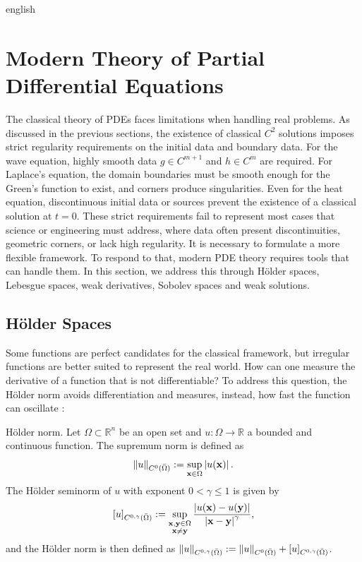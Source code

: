 \documentclass[0000.tex]{subfiles}
\begin{document}
\begin{hyphenrules}{english}
\section{Modern Theory of Partial Differential Equations}\label{sec:modern-theory}

The classical theory of PDEs faces limitations when handling real problems. As discussed in the
previous sections, the existence of classical $C^2$ solutions imposes strict regularity requirements on
the initial data and boundary data. For the wave equation, highly smooth data $g\in C^{m+1}$ and
$h\in C^m$ are required. For Laplace's equation, the domain boundaries must be smooth enough for the
Green's function to exist, and corners produce singularities. Even for the heat equation, discontinuous
initial data or sources prevent the existence of a classical solution at $t=0$. These strict
requirements fail to represent most cases that science or engineering must address, where data often
present discontinuities, geometric corners, or lack high regularity. It is necessary to formulate a more
flexible framework. To respond to that, modern PDE theory requires tools that can handle them. In this
section, we address this through Hölder spaces, Lebesgue spaces, weak derivatives, Sobolev spaces and
weak solutions.

\subsection{Hölder Spaces}\label{subsec:holder}

Some functions are perfect candidates for the classical framework, but irregular functions are better
suited to represent the real world. How can one measure the derivative of a function that is not
differentiable? To address this question, the Hölder norm avoids differentiation and measures, instead,
how fast the function can oscillate \cite{evans2010}:

\begin{definicion}{Hölder norm.}\label{def:holder-norm}
Let $\Omega\subset\mathbb{R}^n$ be an open set and $u:\Omega\to\mathbb{R}$ a bounded and continuous function. The
supremum norm is defined as
\[
  \left\lVert u \right\rVert_{C^0(\bar\Omega)}:=\sup_{\mathbf{x}\in\Omega}\left\lvert u(\mathbf{x}) \right\rvert.
\]
The Hölder seminorm of $u$ with exponent $0<\gamma\le1$ is given by
\[
  [u]_{C^{0,\gamma}(\bar\Omega)}:=\sup_{\substack{\mathbf{x},\mathbf{y}\in\Omega\\ \mathbf{x}\neq\mathbf{y}}}
  \frac{\left\lvert u(\mathbf{x})-u(\mathbf{y}) \right\rvert}{\left\lvert \mathbf{x}-\mathbf{y} \right\rvert^{\gamma}},
\]
and the Hölder norm is then defined as
$\left\lVert u \right\rVert_{C^{0,\gamma}(\bar\Omega)}:=\left\lVert u \right\rVert_{C^0(\bar\Omega)}+[u]_{C^{0,\gamma}(\bar\Omega)}$.
\end{definicion}


\end{hyphenrules}
\end{document}
